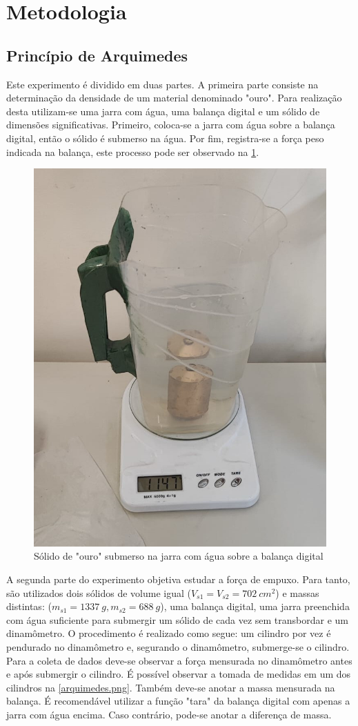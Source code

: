 \section{Metodologia}

\subsection{Princípio de Arquimedes}
Este experimento é dividido em duas partes. A primeira parte consiste na 
determinação da densidade de um material denominado "ouro". Para realização desta
utilizam-se uma jarra com água, uma balança digital e um sólido de dimensões 
significativas. Primeiro, coloca-se a jarra com água sobre a balança digital, 
então o sólido é submerso na água. Por fim, registra-se a força peso indicada na 
balança, este processo pode ser observado na \cref{ouro.png}.

\begin{figure}[H]
    \centering
    \includegraphics[width=.35\linewidth]{fig/ouro.jpeg}
    \caption{Sólido de "ouro" submerso na jarra com água sobre a balança digital}
    \label{ouro.png}
\end{figure}

A segunda parte do experimento objetiva estudar a força de empuxo. Para tanto,
são utilizados dois sólidos de volume igual (\(V_{s1} = V_{s2} = \qty{702}{cm ^2}\))
e massas distintas: (\(m_{s1} = \qty{1337}{g}, m_{s2} = \qty{688}{g}\)), uma balança 
digital, uma jarra preenchida com água suficiente para submergir um sólido de cada vez
sem transbordar e um dinamômetro. O procedimento é realizado como segue: um cilindro 
por vez é pendurado no dinamômetro e, segurando o dinamômetro, submerge-se o cilindro.
Para a coleta de dados deve-se observar a força mensurada no dinamômetro antes e após 
submergir o cilindro. É possível observar a tomada de medidas em um dos cilindros na \cref{arquimedes.png}.
Também deve-se anotar a massa mensurada na balança. É recomendável  utilizar a função "tara" da balança digital 
com apenas a jarra com água encima. Caso contrário,
pode-se anotar a diferença de massa.

